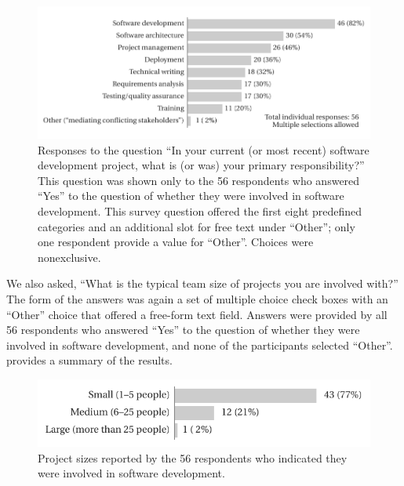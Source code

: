 \documentclass{casicswhitepaper}
\newcommand{\totalDevelopers}{56\xspace}
\begin{document}
\begin{figure}[thb]
  \vspace*{-1ex}
  \centering
  \includegraphics{files/plots/responsibilities.pdf}
  \vspace*{-3ex}
  \caption{Responses to the question  ``In your current (or most recent) software development project, what is (or was) your primary responsibility?''  This question was shown only to the 56 respondents who answered ``Yes'' to the question of whether they were involved in software development.  This survey question offered the first eight predefined categories and an additional slot for free text under ``Other''; only one respondent provide a value for ``Other''.  Choices were nonexclusive.}
  \label{responsibilities}
\end{figure}

We also asked, ``What is the typical team size of projects you are involved with?''  The form of the answers was again a set of multiple choice check boxes with an ``Other'' choice that offered a free-form text field.  Answers were provided by all \totalDevelopers respondents who answered ``Yes'' to the question of whether they were involved in software development, and none of the participants selected ``Other''.   provides a summary of the results.

\begin{figure}[htb]
  \vspace*{-1ex}
  \centering
  \includegraphics{files/plots/project-sizes.pdf}
  \vspace*{-3ex}
  \caption{Project sizes reported by the \totalDevelopers respondents who indicated they were involved in software development.}
  \label{project-sizes}
\end{figure}
\end{document}
